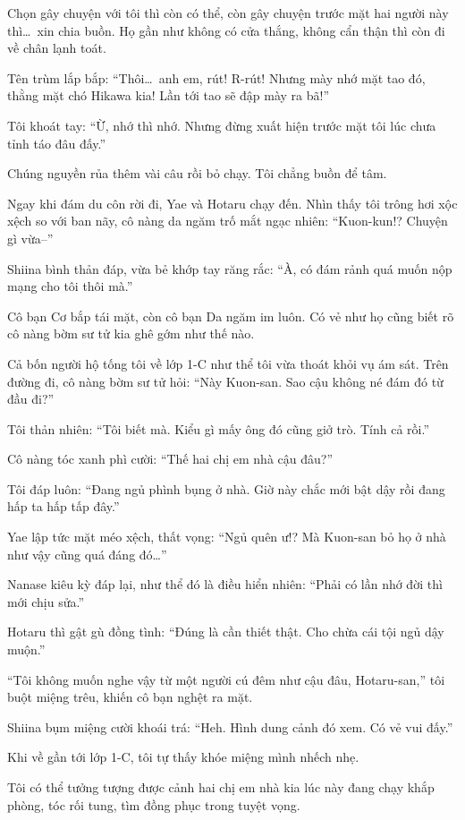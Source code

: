 \documentclass[../main.tex]{subfiles}
\begin{document}
Chọn gây chuyện với tôi thì còn có thể, còn gây chuyện trước mặt hai người này thì\dots\ xin chia buồn. Họ gần như không có cửa thắng, không cẩn thận thì còn đi về chân lạnh toát.

Tên trùm lắp bắp: ``Thôi\dots\ anh em, rút! R-rút! Nhưng mày nhớ mặt tao đó, thằng mặt chó Hikawa kia! Lần tới tao sẽ đập mày ra bã!''

Tôi khoát tay: ``Ừ, nhớ thì nhớ. Nhưng đừng xuất hiện trước mặt tôi lúc chưa tỉnh táo đâu đấy.''

Chúng nguyền rủa thêm vài câu rồi bỏ chạy. Tôi chẳng buồn để tâm.

Ngay khi đám du côn rời đi, Yae và Hotaru chạy đến. Nhìn thấy tôi trông hơi xộc xệch so với ban nãy, cô nàng da ngăm trố mắt ngạc nhiên: ``Kuon-kun!? Chuyện gì vừa--''

Shiina bình thản đáp, vừa bẻ khớp tay răng rắc: ``À, có đám rảnh quá muốn nộp mạng cho tôi thôi mà.''

Cô bạn Cơ bắp tái mặt, còn cô bạn Da ngăm im luôn. Có vẻ như họ cũng biết rõ cô nàng bờm sư tử kia ghê gớm như thế nào.

\ct

Cả bốn người hộ tống tôi về lớp 1-C như thể tôi vừa thoát khỏi vụ ám sát. Trên đường đi, cô nàng bờm sư tử hỏi: ``Này Kuon-san. Sao cậu không né đám đó từ đầu đi?''

Tôi thản nhiên: ``Tôi biết mà. Kiểu gì mấy ông đó cũng giở trò. Tính cả rồi.''

Cô nàng tóc xanh phì cười: ``Thế hai chị em nhà cậu đâu?''

Tôi đáp luôn: ``Đang ngủ phình bụng ở nhà. Giờ này chắc mới bật dậy rồi đang hấp ta hấp tấp đây.''

Yae lập tức mặt méo xệch, thất vọng: ``Ngủ quên ư!? Mà Kuon-san bỏ họ ở nhà như vậy cũng quá đáng đó\dots''

Nanase kiêu kỳ đáp lại, như thể đó là điều hiển nhiên: ``Phải có lần nhớ đời thì mới chịu sửa.''

Hotaru thì gật gù đồng tình: ``Đúng là cần thiết thật. Cho chừa cái tội ngủ dậy muộn.''

``Tôi không muốn nghe vậy từ một người cú đêm như cậu đâu, Hotaru-san,'' tôi buột miệng trêu, khiến cô bạn nghệt ra mặt.

Shiina bụm miệng cười khoái trá: ``Heh. Hình dung cảnh đó xem. Có vẻ vui đấy.''

Khi về gần tới lớp 1-C, tôi tự thấy khóe miệng mình nhếch nhẹ.

Tôi có thể tưởng tượng được cảnh hai chị em nhà kia lúc này đang chạy khắp phòng, tóc rối tung, tìm đồng phục trong tuyệt vọng.
\end{document}
